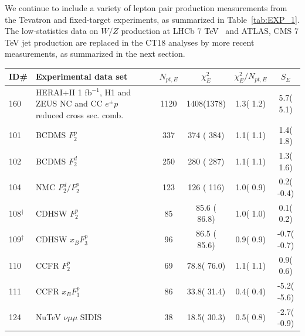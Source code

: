 We continue to include a variety of lepton pair production measurements from the Tevatron and fixed-target experiments, as summarized in Table~\ref{tab:EXP_1}. The low-statistics data on $W/Z$ production at LHCb 7 TeV~\cite{Aaij:2012vn} and ATLAS, CMS 7 TeV jet production \cite{Aad:2011fc, Chatrchyan:2012bja} are replaced in the CT18 analyses by more recent measurements, as summarized in the next section. 



\begingroup

\begin{table}[htbp]
\begin{tabular}{|l|lr|c|c|c|c|}
\hline
\textbf{ID\# }  & \textbf{Experimental data set} &  & $N_{pt, E}$  & $\chi^2_E$ & $\chi^{2}_E/N_{pt, E}$  & $S_E$ \tabularnewline
\hline
\hline
 160 & HERAI+II 1 fb$^{-1}$, H1 and ZEUS NC and CC $e^\pm p$ reduced cross sec. comb.      & \cite{Abramowicz:2015mha}   & 1120  &  1408(1378) &   1.3( 1.2) &   5.7(  5.1)   \tabularnewline\hline
 101 & BCDMS $F_{2}^{p}$                                                                   & \cite{Benvenuti:1989rh}     &  337  &   374 ( 384) &   1.1( 1.1) &   1.4(  1.8)   \tabularnewline\hline
 102 & BCDMS $F_{2}^{d}$                                                                   & \cite{Benvenuti:1989fm}     &  250  &   280 ( 287) &   1.1( 1.1) &   1.3(  1.6)   \tabularnewline\hline
 104 & NMC $F_{2}^{d}/F_{2}^{p}$                                                           & \cite{Arneodo:1996qe}       &  123  &   126 ( 116) &   1.0( 0.9) &   0.2( -0.4)   \tabularnewline\hline
 108$^{\dagger}$ & CDHSW $F_{2}^{p}$                                                       & \cite{Berge:1989hr}         &   85  &    85.6 ( 86.8) &   1.0( 1.0) &   0.1(  0.2)   \tabularnewline\hline         
 109$^{\dagger}$ & CDHSW $x_B F_{3}^{p}$                                                       & \cite{Berge:1989hr}         &   96  &    86.5 (  85.6) &   0.9( 0.9) &  -0.7( -0.7)   \tabularnewline\hline
 110 & CCFR $F_{2}^{p}$                                                                    & \cite{Yang:2000ju}          &   69  &    78.8(  76.0) &   1.1( 1.1) &   0.9(  0.6)   \tabularnewline\hline
 111 & CCFR $x_B F_{3}^{p}$                                                                   & \cite{Seligman:1997mc}      &   86  &    33.8(  31.4) &   0.4( 0.4) &  -5.2( -5.6)   \tabularnewline\hline
 124 & NuTeV $\nu\mu\mu$ SIDIS                                                             & \cite{Mason:2006qa}         &   38  &    18.5(  30.3) &   0.5( 0.8) &  -2.7( -0.9)   \tabularnewline\hline

\end{tabular}
\end{table}
